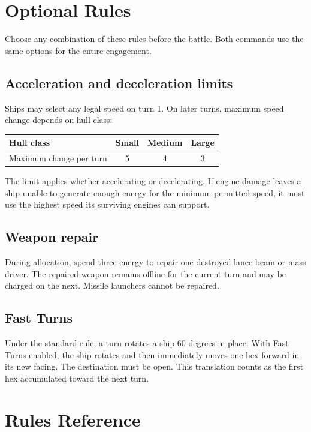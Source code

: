 \chapter{Optional Rules}

Choose any combination of these rules before the battle. Both commands use the same options for the entire engagement.

\section{Acceleration and deceleration limits}

Ships may select any legal speed on turn 1. On later turns, maximum speed change depends on hull class:

\begin{center}
\begin{tabular}{lccc}\toprule
Hull class & Small & Medium & Large\\\midrule
Maximum change per turn & 5 & 4 & 3\\\bottomrule
\end{tabular}
\end{center}

The limit applies whether accelerating or decelerating. If engine damage leaves a ship unable to generate enough energy for the minimum permitted speed, it must use the highest speed its surviving engines can support.

\section{Weapon repair}

During allocation, spend three energy to repair one destroyed lance beam or mass driver. The repaired weapon remains offline for the current turn and may be charged on the next. Missile launchers cannot be repaired.

\section{Fast Turns}

Under the standard rule, a turn rotates a ship 60 degrees in place. With Fast Turns enabled, the ship rotates and then immediately moves one hex forward in its new facing. The destination must be open. This translation counts as the first hex accumulated toward the next turn.

\chapter{Rules Reference}

